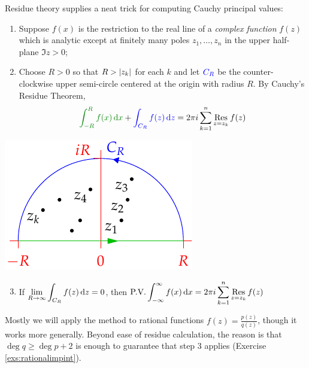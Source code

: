 Residue theory supplies a neat trick for computing Cauchy principal values:\par
\begin{minipage}[t]{0.65\linewidth}\vspace{0pt}
\begin{enumerate}
  \item Suppose $f(x)$ is the restriction to the real line of a \emph{complex function} $f(z)$ which is analytic except at finitely many poles $z_1,\ldots,z_n$ in the upper half-plane $\Im z>0$;
  \item Choose $R>0$ so that $R>\left| z_k\right|$ for each $k$ and let $\textcolor{blue}{C_R}$ be the counter-clockwise upper semi-circle centered at the origin with radius $R$. By Cauchy's Residue Theorem,
  \[\textcolor{Green}{\int_{-R}^Rf(x)\,\dx}+\textcolor{blue}{\int_{C_R}f(z)\,\dz}=2\pi i\sum\limits_{k=1}^n\Resl{z=z_k}f(z)\]
\end{enumerate}
\end{minipage}\begin{minipage}[t]{0.35\linewidth}\vspace{0pt}
\flushright\includegraphics{integral}
\end{minipage}
\begin{enumerate}\setcounter{enumi}{2}
  \item If $\displaystyle\lim\limits_{R\to\infty}\int_{C_R}f(z)\,{\mathrm{d} z}=0$, then
$\displaystyle\text{P.V.}\int_{-\infty}^\infty f(x)\,{\mathrm{d} x}=2\pi i\sum\limits_{k=1}^n\operatorname*{Res}_{z=z_k}f(z)$
\end{enumerate}

Mostly we will apply the method to rational functions $f(z)=\frac{p(z)}{q(z)}$, though it works more generally. Beyond ease of residue calculation, the reason is that $\deg q\ge \deg p+2$ is enough to guarantee that step 3 applies (Exercise \ref{exs:rationalimpint}).

\goodbreak


